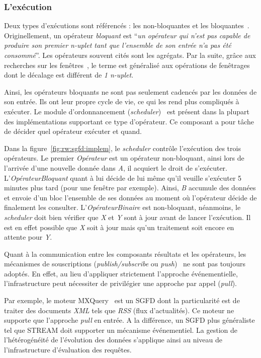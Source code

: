 \subsubsection{L'exécution}
Deux types d'exécutions sont référencés : les non-bloquantes et les bloquantes~\cite{Babcock:issues}. Originellement, un opérateur \textit{bloquant} est \enquote{\it un opérateur qui n'est pas capable de produire son premier n-uplet tant que l'ensemble de son entrée n'a pas été consommé}. Les opérateurs souvent cités sont les agrégats. Par la suite, grâce aux recherches sur les fenêtres~\cite{Maier:semantics}, le terme est généralisé aux opérations de fenêtrages dont le décalage est différent de \textit{1 n-uplet}.

Ainsi, les opérateurs bloquants ne sont pas seulement cadencés par les données de son entrée. Ils ont leur propre cycle de vie, ce qui les rend plus compliqués à exécuter. Le module d'ordonnancement (\textit{scheduler})~\cite{Carney:scheduling} est présent dans la plupart des implémentations supportant ce type d'opérateur. Ce composant a pour tâche de décider quel opérateur exécuter et quand.

Dans la figure~\ref{fig:rw:sgfd:implem}, le \textit{scheduler} contrôle l'exécution des trois opérateurs. Le premier \textit{Opérateur} est un opérateur non-bloquant, ainsi lors de l'arrivée d'une nouvelle donnée dans \textit{A}, il acquiert le droit de s'exécuter. L'\textit{OpérateurBloquant} quant à lui décide de lui même qu'il veuille s'exécuter 5 minutes plus tard (pour une fenêtre par exemple). Ainsi, \textit{B} accumule des données et envoie d'un bloc l'ensemble de ses données au moment où l'opérateur décide de finalement les consulter. L'\textit{OpérateurBinaire} est non-bloquant, néanmoins, le \textit{scheduler} doit bien vérifier que \textit{X} et \textit{Y} sont à jour avant de lancer l'exécution. Il est en effet possible que \textit{X} soit à jour mais qu'un traitement soit encore en attente pour \textit{Y}.

Quant à la communication entre les composants résultats et les opérateurs, les mécanismes de souscriptions (\textit{publish/subscribe} ou \textit{push})~\cite{Eugster:publishsubscribe} ne sont pas toujours adoptés. En effet, au lieu d'appliquer strictement l'approche événementielle, l'infrastructure peut nécessiter de privilégier une approche par appel (\textit{pull}).

Par exemple, le moteur MXQuery~\cite{Botan:MXQuery} est un SGFD dont la particularité est de traiter des documents \textit{XML} tels que \textit{RSS} (flux d'actualités). Ce moteur ne supporte que l'approche \textit{pull} en entrée. A la différence, un SGFD plus généraliste tel que STREAM doit supporter un mécanisme événementiel. La gestion de l'hétérogénéité de l'évolution des données s'applique ainsi au niveau de l'infrastructure d'évaluation des requêtes.

